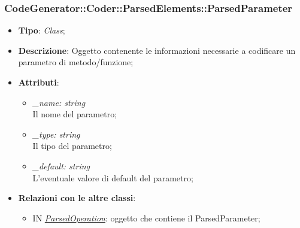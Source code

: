 \documentclass[../DefinizioneDiProdotto.tex]{subfiles}
\begin{document}
				\subsubsection{CodeGenerator::Coder::ParsedElements::ParsedParameter}
			\hypertarget{SWEDesigner::Server::CodeGenerator::Coder::ParsedElements::ParsedParameter}{}
			\begin{itemize}
				\item \textbf{Tipo}: \emph{Class};
				\item \textbf{Descrizione}: Oggetto contenente le informazioni necessarie a codificare un parametro di metodo/funzione;
				\item \textbf{Attributi}:
				\begin{itemize}
					\item \emph{\_name: string}\\
					Il nome del parametro;
					\item \emph{\_type: string}\\
					Il tipo del parametro;
					\item \emph{\_default: string}\\
					L'eventuale valore di default del parametro;
				\end{itemize}
				\item \textbf{Relazioni con le altre classi}:
				\begin{itemize}
					\item IN \hyperlink{SWEDesigner::Server::CodeGenerator::Coder::ParsedElements::ParsedOperation}{\emph{ParsedOperation}}: oggetto che contiene il ParsedParameter;
				\end{itemize}
			\end{itemize}
		
\end{document}
